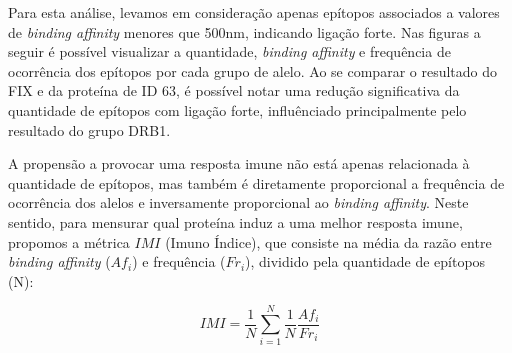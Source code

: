 Para esta análise, levamos em consideração apenas epítopos associados a valores de \textit{binding affinity} 
menores que 500nm, indicando ligação forte. 
Nas figuras a seguir é possível visualizar a quantidade, \textit{binding affinity} e frequência de ocorrência 
dos epítopos por cada grupo de alelo. Ao se comparar o resultado do FIX e da proteína de ID 63,
é possível notar uma redução significativa da quantidade de epítopos com ligação forte, influênciado principalmente 
pelo resultado do grupo DRB1. 

\begin{figure}%
    \centering
    \qquad
\end{figure}

A propensão a provocar uma resposta imune não está apenas relacionada à quantidade de epítopos, 
mas também é diretamente proporcional a frequência de ocorrência dos alelos e inversamente proporcional 
ao \textit{binding affinity}. Neste sentido, para mensurar qual proteína induz a uma melhor resposta imune, propomos a 
métrica $IMI$ (Imuno Índice), que consiste na média da razão entre \textit{binding affinity} (${Af}_{i}$) 
e frequência ($Fr_{i}$), 
dividido pela quantidade de epítopos (N):

\begin{equation}
    IMI = \frac{1}{N} \sum_{i=1}^{N} \frac{1}{N} \frac{{Af}_{i}}{Fr_{i}}
\end{equation}

